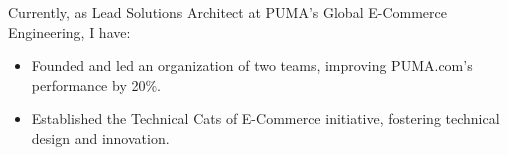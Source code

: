\begin{itemize}


\end{itemize}

\vspace{2ex}

Currently, as Lead Solutions Architect at PUMA’s Global E-Commerce Engineering, I have:


\begin{itemize}

\item Founded and led an organization of two teams, improving PUMA.com’s performance by 20\%.
\item Established the Technical Cats of E-Commerce initiative, fostering technical design and innovation.

\end{itemize}




